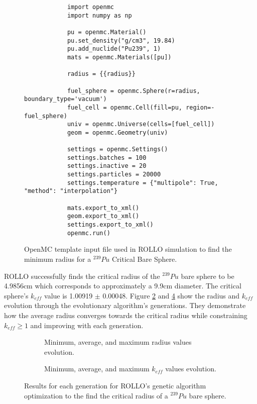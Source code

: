 \begin{figure}[htbp]
    \begin{verbatim}
            import openmc 
            import numpy as np

            pu = openmc.Material()
            pu.set_density("g/cm3", 19.84)
            pu.add_nuclide("Pu239", 1)
            mats = openmc.Materials([pu])
            
            radius = {{radius}}
            
            fuel_sphere = openmc.Sphere(r=radius, boundary_type='vacuum')
            fuel_cell = openmc.Cell(fill=pu, region=-fuel_sphere)
            univ = openmc.Universe(cells=[fuel_cell])
            geom = openmc.Geometry(univ)
            
            settings = openmc.Settings()
            settings.batches = 100
            settings.inactive = 20
            settings.particles = 20000
            settings.temperature = {"multipole": True, "method": "interpolation"}
            
            mats.export_to_xml()
            geom.export_to_xml()
            settings.export_to_xml()
            openmc.run()
    \end{verbatim}
    \caption{OpenMC template input file used in ROLLO simulation to find the 
    minimum radius for a $^{239}Pu$ Critical Bare Sphere.}
    \label{fig:critical_sphere.py}
\end{figure}  

\gls{ROLLO} successfully finds the critical radius of the $^{239}Pu$ bare sphere 
to be 4.9856cm which corresponds to approximately a 9.9cm diameter. 
The critical sphere's $k_{eff}$ value is 1.00919 $\pm$ 0.00048. 
Figure \ref{fig:verification-radius} and \ref{fig:verification-keff} show the 
radius and $k_{eff}$ evolution through the evolutionary algorithm's 
generations. 
They demonstrate how the average radius converges towards the critical radius while 
constraining $k_{eff} \geq 1$ and improving with each generation.
\begin{figure}[htbp]
    \centering
    \begin{subfigure}{\textwidth}
    \caption{Minimum, average, and maximum radius values evolution.}
    \label{fig:verification-radius}
    \end{subfigure}
    \begin{subfigure}{\textwidth}
        \caption{Minimum, average, and maximum $k_{eff}$ values evolution.}
        \label{fig:verification-keff}
    \end{subfigure}
    \caption{Results for each generation for \gls{ROLLO}'s genetic algorithm optimization 
    to the find the critical radius of a  $^{239}Pu$ bare sphere.}
\end{figure}

